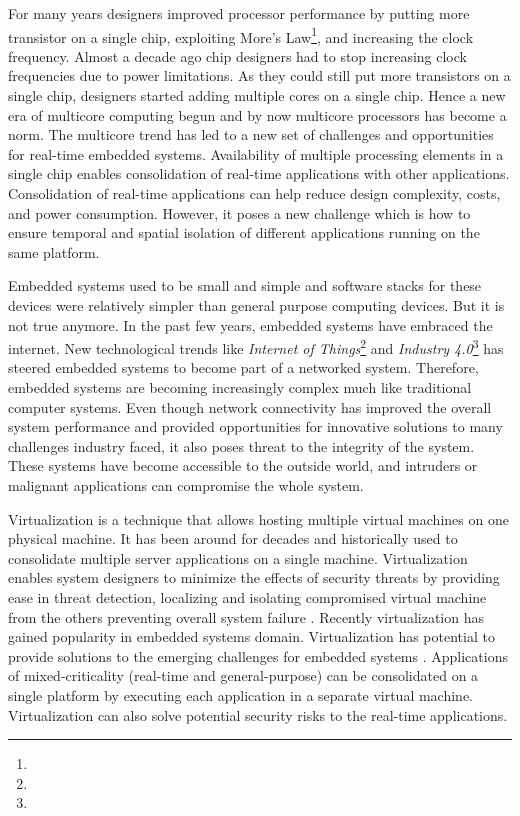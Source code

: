 For many years designers improved processor performance by putting more transistor on a single chip, exploiting More's Law\footnote{\moreslaw}, and increasing the clock frequency.
Almost a decade ago chip designers had to stop increasing clock frequencies due to power limitations.
As they could still put more transistors on a single chip, designers started adding multiple cores on a single chip.
Hence a new era of multicore computing begun and by now multicore processors has become a norm.
The multicore trend has led to a new set of challenges and opportunities for real-time embedded systems.
Availability of multiple processing elements in a single chip enables consolidation of real-time applications with other applications.
Consolidation of real-time applications can help reduce design complexity, costs, and power consumption.
However, it poses a new challenge which is how to ensure temporal and spatial isolation of different applications running on the same platform.

Embedded systems used to be small and simple and software stacks for these devices were relatively simpler
than general purpose computing devices. But it is not true anymore.
In the past few years, embedded systems have embraced the internet. New technological trends like \emph{Internet of Things}\footnote{\IoT} and \emph{Industry 4.0}\footnote{\industry}
has steered embedded systems to become part of a networked system.
Therefore, embedded systems are becoming increasingly complex much like traditional computer systems.
Even though network connectivity has improved the overall system performance and provided opportunities for innovative solutions to many challenges industry faced,
it also poses threat to the integrity of the system.
These systems have become accessible to the outside world, and intruders or malignant applications can compromise the whole system.

Virtualization is a technique that allows hosting multiple virtual machines on one physical machine. 
It has been around for decades and historically used to consolidate multiple server applications on a single machine.
Virtualization enables system designers to minimize the effects of security threats 
by providing ease in threat detection, localizing and isolating compromised virtual machine from the others preventing overall system failure \cite{Chen:2001:VBR:874075.876409}.
Recently virtualization has gained popularity in embedded systems domain.
Virtualization has potential to provide solutions to the emerging challenges for embedded systems \cite{Heiser:2008:RVE:1435458.1435461}.
Applications of mixed-criticality (real-time and general-purpose) can be consolidated on a single platform by executing each 
application in a separate virtual machine.
Virtualization can also solve potential security risks to the real-time applications.

